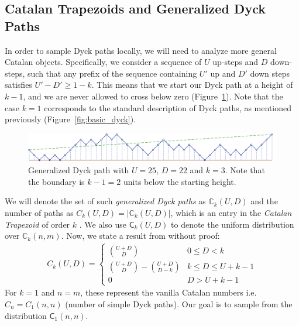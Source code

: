 \subsection{Catalan Trapezoids and Generalized Dyck Paths}
In order to sample Dyck paths locally, we will need to analyze more general Catalan objects.
Specifically, we consider a sequence of $U$ up-steps and $D$ down-steps,
such that any prefix of the sequence containing $U'$ up and $D'$ down steps satisfies $U'-D' \ge 1-k$.
This means that we start our Dyck path at a height of $k-1$, and we are never allowed to cross below zero (Figure~\ref{fig:complex_dyck}).
Note that the case $k=1$ corresponds to the standard description of Dyck paths, as mentioned previously (Figure~\ref{fig:basic_dyck}).
\begin{figure}[htbp]
    \centering
    \includegraphics[width=\textwidth]{images/complex_dyck_path.pdf}
    \caption{Generalized Dyck path with $U = 25$, $D = 22$ and $k = 3$.
             Note that the boundary is $k-1 = 2$ units below the starting height.} \label{fig:complex_dyck}
\end{figure}

We will denote the set of such \emph{generalized Dyck paths} as $\mathbb C_k(U,D)$ and the number of paths as $C_k(U,D) = |\mathbb C_k(U,D)|$,
which is an entry in the \textit{Catalan Trapezoid} of order $k$ \cite{trap}.
We also use $\mathsf C_k(U,D)$ to denote the uniform distribution over $\mathbb C_k(n,m)$.
Now, we state a result from \cite{trap} without proof:
\begin{align}
    \label{eq:catalan_trapezoid}
    C_k(U,D)=
    \begin{cases}
    \binom{U+D}{D} &0\le D<k\\
    \binom{U+D}{D} - \binom{U+D}{D-k} &k\le D\le U+k-1\\
    0 &D>U+k-1
    \end{cases}
\end{align}
For $k = 1$ and $n=m$, these represent the vanilla Catalan numbers i.e. $C_n = C_1(n,n)$ (number of simple Dyck paths).
Our goal is to sample from the distribution $\mathsf C_1(n,n)$.

